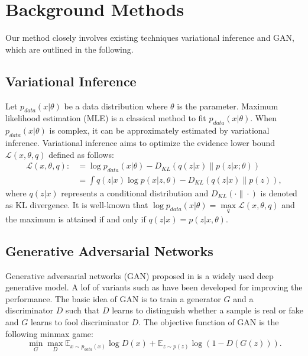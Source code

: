 \documentclass[a4paper,conference]{IEEEtran}
\begin{document}
\section{Background Methods}
Our method closely involves existing techniques variational inference and GAN, which are outlined in the following.

\subsection{Variational Inference}

Let $p_{data}(x| \theta)$ be a data distribution where $\theta$ is the parameter. Maximum likelihood estimation (MLE)  is  a classical method to fit $p_{data}(x|\theta)$. %
When $p_{data}(x|\theta)$ is complex, it can be approximately estimated by variational inference. Variational inference aims to optimize the evidence lower bound $\mathcal{L}(x, \theta, q)$  defined as follows:
\begin{align*}
\mathcal{L}(x, \theta, q):&= \log p_{data}(x| \theta) - D_{KL}(q(z|x)\| p(z|x;\theta))\\
&= \int q(z|x)\log p(x|z, \theta) - D_{KL}(q(z|x)\| p(z)),
\end{align*}
where $q(z|x)$ represents a conditional distribution and $D_{KL}(\cdot\|\cdot)$ is denoted as KL divergence. It is well-known that $\log p_{data}(x|\theta)= \max\limits_{q}\mathcal{L}(x, \theta, q)$ and the maximum is attained if and only if $q(z|x) = p(z|x,\theta)$.
\subsection{Generative Adversarial Networks}
Generative adversarial networks (GAN) proposed in \cite{NIPS2014} is a widely used deep generative model. A lof of variants such as \cite{eghbal2017likelihood}\cite{grover2017flow} have been developed for improving the performance. The basic idea of GAN is to  train a generator $G$ and a discriminator $D$ such that $D$ learns to distinguish whether a sample is real or fake and $G$ learns to fool  discriminator $D$. The objective function of GAN is the following minmax game:
\begin{equation*}%
\min\limits_{G}\max\limits_{D}\mathbb{E}_{x\sim p_{data}(x)}\log D(x) + \mathbb{E}_{z\sim p(z)}\log (1-D(G(z))).
\end{equation*}
\end{document}
